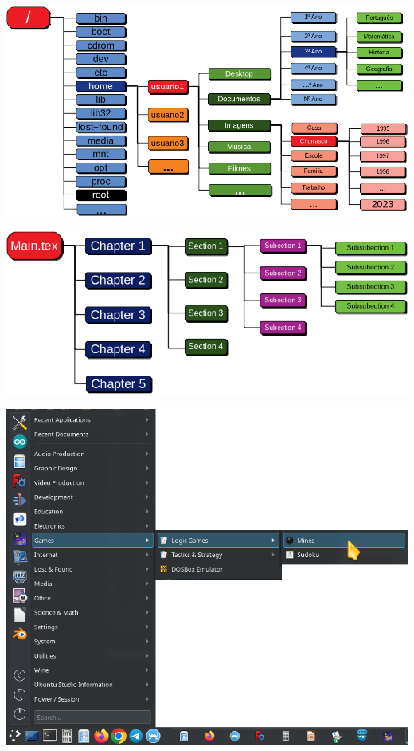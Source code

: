 \begin{center}
	\includegraphics[height=\textheight]{./IMG-GIT/SVG/DIAGRAMAS.png}
\end{center}
\pagebreak

\begin{center}
	\includegraphics[width=\linewidth]{./IMG-GIT/SVG/DIAGRAMAS2.png}
\end{center}
\pagebreak


\begin{center}
	\includegraphics[height=\textheight]{./IMG-GIT/menu.png}
\end{center}
\pagebreak

